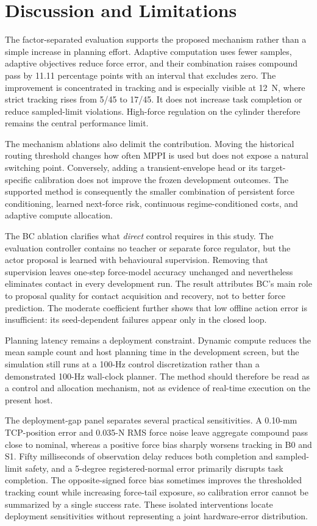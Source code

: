 \section{Discussion and Limitations}
\label{sec:discussion}

The factor-separated evaluation supports the proposed mechanism rather than a
simple increase in planning effort. Adaptive computation uses fewer samples,
adaptive objectives reduce force error, and their combination raises compound
pass by 11.11 percentage points with an interval that excludes zero. The
improvement is concentrated in tracking and is especially visible at 12~N,
where strict tracking rises from 5/45 to 17/45. It does not increase task
completion or reduce sampled-limit violations. High-force regulation on the
cylinder therefore remains the central performance limit.

The mechanism ablations also delimit the contribution. Moving the historical
routing threshold changes how often MPPI is used but does not expose a natural
switching point. Conversely, adding a transient-envelope head or its
target-specific calibration does not improve the frozen development outcomes.
The supported method is consequently the smaller combination of persistent
force conditioning, learned next-force risk, continuous regime-conditioned
costs, and adaptive compute allocation.

The BC ablation clarifies what \emph{direct} control requires in this study.
The evaluation controller contains no teacher or separate force regulator,
but the actor proposal is learned with behavioural supervision. Removing that
supervision leaves one-step force-model accuracy unchanged and nevertheless
eliminates contact in every development run. The result attributes BC's main
role to proposal quality for contact acquisition and recovery, not to better
force prediction. The moderate coefficient further shows that low offline
action error is insufficient: its seed-dependent failures appear only in the
closed loop.

Planning latency remains a deployment constraint. Dynamic compute reduces the
mean sample count and host planning time in the development screen, but the
simulation still runs at a 100-Hz control discretization rather than a
demonstrated 100-Hz wall-clock planner. The method should therefore be read as
a control and allocation mechanism, not as evidence of real-time execution on
the present host.

The deployment-gap panel separates several practical sensitivities.  A
0.10-mm TCP-position error and 0.035-N RMS force noise leave aggregate
compound pass close to nominal, whereas a positive force bias sharply worsens
tracking in B0 and S1.  Fifty milliseconds of observation delay reduces both
completion and sampled-limit safety, and a 5-degree registered-normal error
primarily disrupts task completion.  The opposite-signed force bias sometimes
improves the thresholded tracking count while increasing force-tail exposure,
so calibration error cannot be summarized by a single success rate.  These
isolated interventions locate deployment sensitivities without representing
a joint hardware-error distribution.

